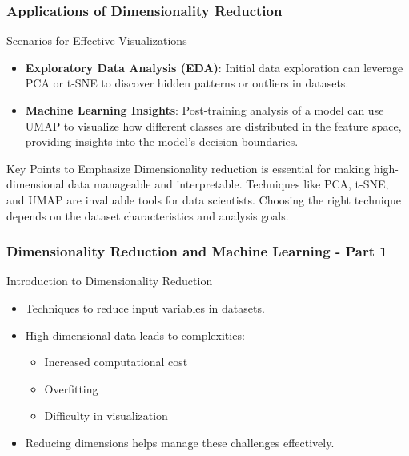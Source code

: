 \documentclass[aspectratio=169]{beamer}
\begin{document}
\begin{frame}[fragile]
    \frametitle{Applications of Dimensionality Reduction}
    \begin{block}{Scenarios for Effective Visualizations}
        \begin{itemize}
            \item \textbf{Exploratory Data Analysis (EDA)}: Initial data exploration can leverage PCA or t-SNE to discover hidden patterns or outliers in datasets.
            \item \textbf{Machine Learning Insights}: Post-training analysis of a model can use UMAP to visualize how different classes are distributed in the feature space, providing insights into the model's decision boundaries.
        \end{itemize}
    \end{block}
    \begin{block}{Key Points to Emphasize}
        Dimensionality reduction is essential for making high-dimensional data manageable and interpretable. Techniques like PCA, t-SNE, and UMAP are invaluable tools for data scientists. Choosing the right technique depends on the dataset characteristics and analysis goals.
    \end{block}
\end{frame}

\begin{frame}[fragile]
    \frametitle{Dimensionality Reduction and Machine Learning - Part 1}
    \begin{block}{Introduction to Dimensionality Reduction}
        \begin{itemize}
            \item Techniques to reduce input variables in datasets.
            \item High-dimensional data leads to complexities:
                \begin{itemize}
                    \item Increased computational cost
                    \item Overfitting
                    \item Difficulty in visualization
                \end{itemize}
            \item Reducing dimensions helps manage these challenges effectively.
        \end{itemize}
    \end{block}
\end{frame}
\end{document}
